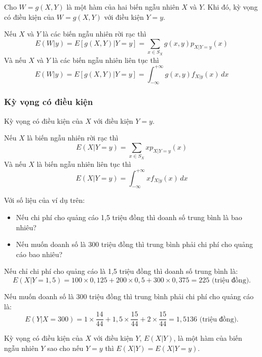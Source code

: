 \documentclass[12pt,a4paper]{article}
\begin{document}
\begin{dinhly}
Cho $W = g(X, Y)$ là một hàm của hai biến ngẫu nhiên $X$ và $Y$. Khi đó, kỳ vọng có điều kiện của
$W = g(X, Y)$ với điều kiện $Y = y$.

Nếu $X$ và $Y$ là các biến ngẫu nhiên rời rạc thì
\[
  E(W|y) = E[g(X, Y)|Y = y] = \displaystyle\sum_{x \in S_X} g(x, y)p_{X|Y =y}(x)
\]
Và nếu $X$ và $Y$ là các biến ngẫu nhiên liên tục thì
\[
  E(W|y) = E[g(X, Y)|Y = y] = \displaystyle\int_{-\infty}^{+\infty} g(x, y)f_{X|y}(x) \, dx
\]
\end{dinhly}

\subsubsection{Kỳ vọng có điều kiện}

\begin{dinhnghia}
Kỳ vọng có điều kiện của $X$ với điều kiện $Y = y$.

Nếu $X$ là biến ngẫu nhiên rời rạc thì
\[
  E(X|Y = y) = \displaystyle\sum_{x \in S_X} x p_{X|Y =y}(x)
\]
Và nếu $X$ là biến ngẫu nhiên liên tục thì
\[
  E(X|Y = y) = \displaystyle\int_{-\infty}^{+\infty} x f_{X|y}(x) \, dx
\]
\end{dinhnghia}

\begin{vidu}
Với số liệu của ví dụ trên:
\begin{itemize}
  \item Nếu chi phí cho quảng cáo 1,5 triệu đồng thì doanh số trung bình là bao nhiêu?
  \item Nếu muốn doanh số là 300 triệu đồng thì trung bình phải chi phí cho quảng cáo bao nhiêu?
\end{itemize}

Nếu chỉ chi phí cho quảng cáo là 1,5 triệu đồng thì doanh số trung bình là:
\[
  E(X|Y = 1, 5) = 100 \times 0, 125 + 200 \times 0, 5 + 300 \times 0, 375 = 225 \text{ (triệu đồng)}.
\]

Nếu muốn doanh số là 300 triệu đồng thì trung bình phải chi phí cho quảng cáo là:
\[
  E(Y |X = 300) = 1 \times \dfrac{14}{44} + 1, 5 \times \dfrac{15}{44} + 2 \times \dfrac{15}{44} = 1, 5136 \text{ (triệu đồng)}.
\]
\end{vidu}

\begin{dinhnghia}
Kỳ vọng có điều kiện của $X$ với điều kiện $Y$, $E(X|Y)$, là một hàm của biến ngẫu nhiên $Y$ sao cho nếu $Y = y$ thì $E(X|Y) = E(X|Y = y)$.
\end{dinhnghia}
\end{document}
